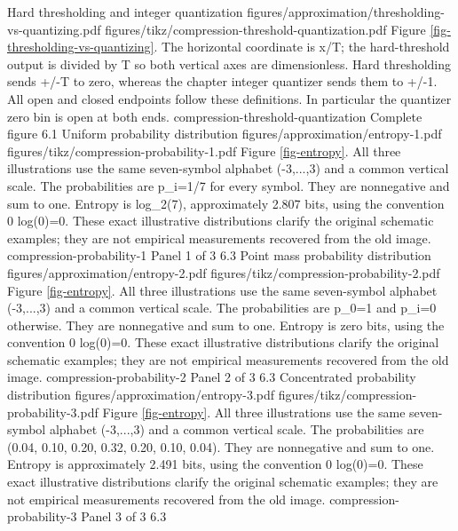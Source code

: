 {Hard thresholding and integer quantization}
{figures/approximation/thresholding-vs-quantizing.pdf}
{figures/tikz/compression-threshold-quantization.pdf}
{Figure \ref{fig-thresholding-vs-quantizing}.}
{The horizontal coordinate is x/T; the hard-threshold output is divided by T so both vertical axes are dimensionless. Hard thresholding sends +/-T to zero, whereas the chapter integer quantizer sends them to +/-1. All open and closed endpoints follow these definitions. In particular the quantizer zero bin is open at both ends.}
{compression-threshold-quantization}
{Complete figure}
{6.1}
{Uniform probability distribution}
{figures/approximation/entropy-1.pdf}
{figures/tikz/compression-probability-1.pdf}
{Figure \ref{fig-entropy}.}
{All three illustrations use the same seven-symbol alphabet (-3,...,3) and a common vertical scale. The probabilities are p\_i=1/7 for every symbol. They are nonnegative and sum to one. Entropy is log\_2(7), approximately 2.807 bits, using the convention 0 log(0)=0. These exact illustrative distributions clarify the original schematic examples; they are not empirical measurements recovered from the old image.}
{compression-probability-1}
{Panel 1 of 3}
{6.3}
{Point mass probability distribution}
{figures/approximation/entropy-2.pdf}
{figures/tikz/compression-probability-2.pdf}
{Figure \ref{fig-entropy}.}
{All three illustrations use the same seven-symbol alphabet (-3,...,3) and a common vertical scale. The probabilities are p\_0=1 and p\_i=0 otherwise. They are nonnegative and sum to one. Entropy is zero bits, using the convention 0 log(0)=0. These exact illustrative distributions clarify the original schematic examples; they are not empirical measurements recovered from the old image.}
{compression-probability-2}
{Panel 2 of 3}
{6.3}
{Concentrated probability distribution}
{figures/approximation/entropy-3.pdf}
{figures/tikz/compression-probability-3.pdf}
{Figure \ref{fig-entropy}.}
{All three illustrations use the same seven-symbol alphabet (-3,...,3) and a common vertical scale. The probabilities are (0.04, 0.10, 0.20, 0.32, 0.20, 0.10, 0.04). They are nonnegative and sum to one. Entropy is approximately 2.491 bits, using the convention 0 log(0)=0. These exact illustrative distributions clarify the original schematic examples; they are not empirical measurements recovered from the old image.}
{compression-probability-3}
{Panel 3 of 3}
{6.3}
